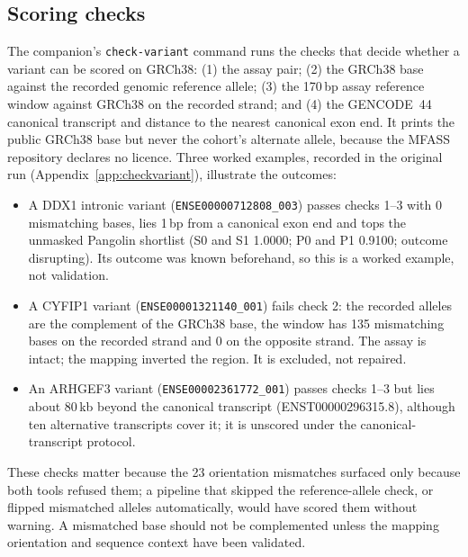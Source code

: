 \documentclass[11pt]{article}
\begin{document}
\subsection{Scoring checks}\label{sec:qc}
The companion's \texttt{check-variant} command runs the checks that decide whether a variant can be scored on
GRCh38: (1) the assay pair; (2) the GRCh38 base against the recorded genomic reference allele; (3) the 170\,bp
assay reference window against GRCh38 on the recorded strand; and (4) the GENCODE~44 canonical transcript and
distance to the nearest canonical exon end. It prints the public GRCh38 base but never the cohort's alternate
allele, because the MFASS repository declares no licence. Three worked examples, recorded in the original run
(Appendix~\ref{app:checkvariant}), illustrate the outcomes:
\begin{itemize}
\item A DDX1 intronic variant (\texttt{ENSE00000712808\_003}) passes checks 1--3 with 0 mismatching bases, lies
1\,bp from a canonical exon end and tops the unmasked Pangolin shortlist (S0 and S1 1.0000; P0 and P1 0.9100;
outcome disrupting). Its outcome was known beforehand, so this is a worked example, not validation.
\item A CYFIP1 variant (\texttt{ENSE00001321140\_001}) fails check 2: the recorded alleles are the complement of
the GRCh38 base, the window has 135 mismatching bases on the recorded strand and 0 on the opposite strand. The
assay is intact; the mapping inverted the region. It is excluded, not repaired.
\item An ARHGEF3 variant (\texttt{ENSE00002361772\_001}) passes checks 1--3 but lies about 80\,kb beyond the
canonical transcript (ENST00000296315.8), although ten alternative transcripts cover it; it is unscored under
the canonical-transcript protocol.
\end{itemize}
These checks matter because the 23 orientation mismatches surfaced only because both tools refused them; a
pipeline that skipped the reference-allele check, or flipped mismatched alleles automatically, would have scored
them without warning. A mismatched base should not be complemented unless the mapping orientation and sequence context
have been validated.
\end{document}
